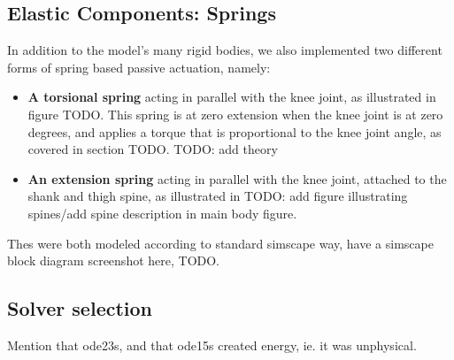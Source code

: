 \subsection{Elastic Components: Springs}

In addition to the model's many rigid bodies, we also implemented two different forms of spring based passive actuation, namely: 
\begin{itemize}
\item \textbf{A torsional spring} acting in parallel with the knee joint, as illustrated in figure TODO. This spring is at zero extension when the knee joint is at zero degrees, and applies a torque that is proportional to the knee joint angle, as covered in section TODO. TODO: add theory
\item \textbf{An extension spring} acting in parallel with the knee joint, attached to the shank and thigh spine, as illustrated in TODO: add figure illustrating spines/add spine description in main body figure. 
\end{itemize}

Thes were both modeled according to standard simscape way, have a simscape block diagram screenshot here, TODO. 

\subsection{Solver selection}

Mention that ode23s, and that ode15s created energy, ie. it was unphysical.





